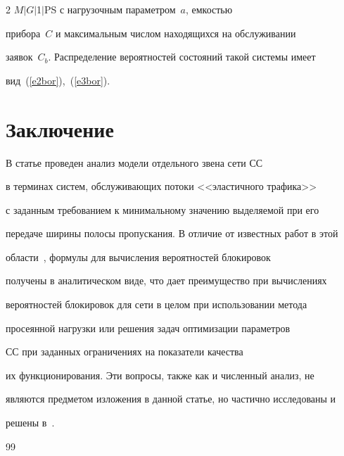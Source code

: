 \begin{multicols}{2}
$M$$\vert$$G$$\vert$1$\vert$PS с нагрузочным параметром~$a$, емкостью 


прибора~$C$ и максимальным числом находящихся на обслуживании 


заявок~$C_b$. Распределение вероятностей состояний такой сис\-те\-мы имеет 


вид~(\ref{e2bor}),~(\ref{e3bor}).


  


  \section{Заключение}


  


  В статье проведен анализ модели отдельного звена сети СС 


  в терминах систем, обслуживающих потоки <<эластичного трафика>> 


с заданным требованием к минимальному значению выделяемой при его 


передаче ширины полосы пропускания. В отличие от известных работ в этой 


области~\cite{6bor, 7bor}, формулы для вычисления вероятностей блокировок 


получены в аналитическом виде, что дает преимущество при вычислениях 


вероятностей блокировок для сети в целом при использовании метода 


просеянной нагрузки или решения задач оптимизации па\-ра\-мет\-ров 


СС при  заданных ограничениях на показатели качества 


их функционирования. Эти вопросы, также как и численный анализ, не 


являются предметом изложения в данной статье, но частично исследованы и 


решены в~\cite{5bor}.





{\small\frenchspacing


{%




\begin{thebibliography}{99}    


  





\end{thebibliography}}}
\end{multicols}
